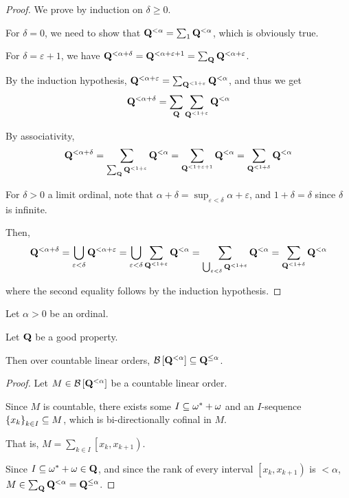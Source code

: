 \begin{proof}
  We prove by induction on $\delta \ge 0$.

  For $\delta = 0$, we need to show that $\mathbf{Q}^{< \alpha} = \sum_{1}\mathbf{Q}^{< \alpha}$,
  which is obviously true.

  For $\delta = \varepsilon + 1$, we have
  $
    \mathbf{Q}^{< \alpha + \delta}
    = \mathbf{Q}^{< \alpha + \varepsilon + 1}
    = \sum_{\mathbf{Q}}{\mathbf{Q}^{< \alpha + \varepsilon}}
  $.

  By the induction hypothesis,
  $
    \mathbf{Q}^{< \alpha + \varepsilon}
    = \sum_{\mathbf{Q}^{< 1 + \varepsilon}}{\mathbf{Q}^{< \alpha}}
  $, and thus we get
  \[
    \mathbf{Q}^{< \alpha + \delta} = \sum_{\mathbf{Q}}{\sum_{\mathbf{Q}^{< 1 + \varepsilon}}{\mathbf{Q}^{< \alpha}}}
  \]

  By associativity,
  \[\mathbf{Q}^{< \alpha + \delta}
    = \sum_{\sum_{\mathbf{Q}}{\mathbf{Q}^{< 1 + \varepsilon}}}{\mathbf{Q}^{< \alpha}}
    = \sum_{\mathbf{Q}^{< 1 + \varepsilon + 1}}{\mathbf{Q}^{< \alpha}}
    = \sum_{\mathbf{Q}^{< 1 + \delta}}{\mathbf{Q}^{< \alpha}}\]

  For $\delta > 0$ a limit ordinal, note that $\alpha + \delta = \sup_{\varepsilon < \delta}{\alpha + \varepsilon}$,
  and $1 + \delta = \delta$ since $\delta$ is infinite.

  Then,
  \[
    \mathbf{Q}^{< \alpha + \delta}
    = \bigcup_{\varepsilon < \delta}{\mathbf{Q}^{< \alpha + \varepsilon}}
    = \bigcup_{\varepsilon < \delta}{\sum_{\mathbf{Q}^{< 1 + \varepsilon}}{\mathbf{Q}^{< \alpha}}}
    = \sum_{\bigcup_{\varepsilon < \delta}{\mathbf{Q}^{< 1 + \varepsilon}}}{\mathbf{Q}^{< \alpha}}
    = \sum_{\mathbf{Q}^{< 1 + \delta}}{\mathbf{Q}^{< \alpha}}
  \]

  where the second equality follows by the induction hypothesis.

\end{proof}



\begin{lemma}
  Let $\alpha > 0$ be an ordinal.

  Let $\mathbf{Q}$ be a good property.

  Then over countable linear orders, $\mathcal{B} \left[ {{\mathbf{Q}^{< \alpha}}} \right] \subseteq \mathbf{Q}^{\le \alpha}$.
\end{lemma}

\begin{proof}
  Let $M \in \mathcal{B} \left[ {{\mathbf{Q}^{< \alpha}}} \right]$ be a countable linear order.

  Since $M$ is countable, there exists some $I \subseteq \omega^\ast + \omega$ and
  an $I$-sequence $\left\{ {x_k} \right\}_{k \in I} \subseteq M$,
  which is bi-directionally cofinal in $M$.

  That is, $M = \sum_{k \in I} \left[ x_k, x_{k + 1} \right)$.

  Since $I \subseteq \omega^\ast + \omega \in \mathbf{Q}$, and
  since the rank of every interval $\left[ x_k, x_{k + 1} \right)$ is $< \alpha$,
  $M \in \sum_{\mathbf{Q}}{\mathbf{Q}^{< \alpha}} = \mathbf{Q}^{\le \alpha}$.

\end{proof}